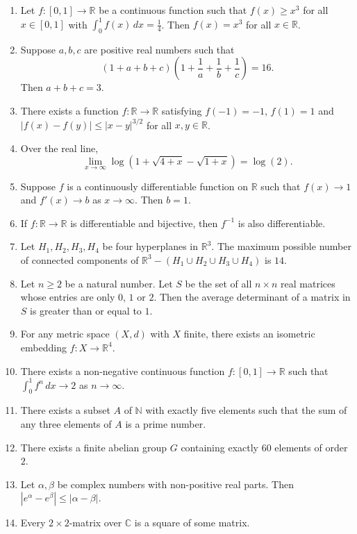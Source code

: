 \documentclass[11pt, a4paper]{article}
\begin{document}
\begin{enumerate}
  \item Let $f:[0,1] \to \mathbb{R}$ be a continuous function such that $f(x) \ge x^3$ for all $x \in [0,1]$ with $\int_0^1 f(x)\,dx = \frac{1}{4}$. Then $f(x) = x^3$ for all $x \in \mathbb{R}$.
  \item Suppose $a, b, c$ are positive real numbers such that
  \[
    (1 + a + b + c)\left(1 + \frac{1}{a} + \frac{1}{b} + \frac{1}{c}\right) = 16.
  \]
  Then $a + b + c = 3$.
  \item There exists a function $f:\mathbb{R} \to \mathbb{R}$ satisfying $f(-1) = -1$, $f(1) = 1$ and $|f(x) - f(y)| \le |x - y|^{3/2}$ for all $x, y \in \mathbb{R}$.
  \item Over the real line,
  \[
    \lim_{x \to \infty} \log\left(1 + \sqrt{4 + x} - \sqrt{1 + x}\right) = \log(2).
  \]
  \item Suppose $f$ is a continuously differentiable function on $\mathbb{R}$ such that $f(x) \to 1$ and $f'(x) \to b$ as $x \to \infty$. Then $b = 1$.
  \item If $f:\mathbb{R} \to \mathbb{R}$ is differentiable and bijective, then $f^{-1}$ is also differentiable.
  \item Let $H_1, H_2, H_3, H_4$ be four hyperplanes in $\mathbb{R}^3$. The maximum possible number of connected components of $\mathbb{R}^3 - (H_1 \cup H_2 \cup H_3 \cup H_4)$ is $14$.
  \item Let $n \ge 2$ be a natural number. Let $S$ be the set of all $n \times n$ real matrices whose entries are only $0$, $1$ or $2$. Then the average determinant of a matrix in $S$ is greater than or equal to $1$.
  \item For any metric space $(X, d)$ with $X$ finite, there exists an isometric embedding $f: X \to \mathbb{R}^4$.
  \item There exists a non-negative continuous function $f:[0,1] \to \mathbb{R}$ such that $\int_0^1 f^n\,dx \to 2$ as $n \to \infty$.
  \item There exists a subset $A$ of $\mathbb{N}$ with exactly five elements such that the sum of any three elements of $A$ is a prime number.
  \item There exists a finite abelian group $G$ containing exactly $60$ elements of order $2$.
  \item Let $\alpha, \beta$ be complex numbers with non-positive real parts. Then $|e^\alpha - e^\beta| \le |\alpha - \beta|$.
  \item Every $2 \times 2$-matrix over $\mathbb{C}$ is a square of some matrix.

\end{enumerate}
\end{document}

